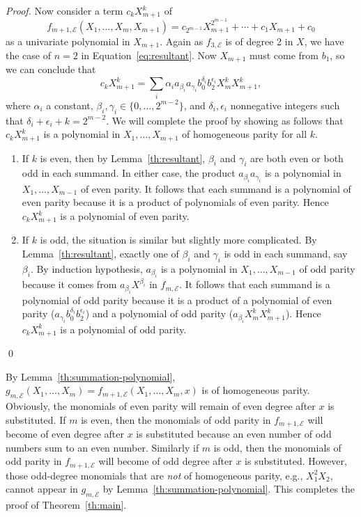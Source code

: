 \begin{proof}
  Now consider a term $c_kX_{m+1}^k$ of
  \[ f_{m+1,\mathcal
      E}(X_1,\ldots,X_m,X_{m+1})=c_{2^{m-1}}X_{m+1}^{2^{m-1}}+\cdots+c_1X_{m+1}+c_0 \]
  as a univariate polynomial in $X_{m+1}$.
  Again as $f_{3,\mathcal E}$ is of degree 2 in $X$, we have the case
  of $n=2$ in Equation~\ref{eq:resultant}.
  Now $X_{m+1}$ must come from $b_1$, so we can conclude that
  \[ c_kX_{m+1}^k=\sum_i\alpha_i a_{\beta_i} a_{\gamma_i}
    b_0^{\delta_i} b_2^{\epsilon_i} X_m^kX_{m+1}^k, \] where
  $\alpha_i$ a constant, $\beta_i,\gamma_i\in\{0,\ldots,2^{m-2}\}$,
  and $\delta_i,\epsilon_i$ nonnegative integers such that
  $\delta_i+\epsilon_i+k=2^{m-2}$.
  We will complete the proof by showing as follows that $c_kX_{m+1}^k$
  is a polynomial in $X_1,\ldots,X_{m+1}$ of homogeneous parity for
  all $k$.
  \begin{enumerate}
  \item If $k$ is even, then by Lemma~\ref{th:resultant},  $\beta_i$
    and $\gamma_i$ are both even or both odd in each summand.
    In either case, the product $a_{\beta_i}a_{\gamma_i}$ is a
    polynomial in $X_1,\ldots,X_{m-1}$ of even parity.
    It follows that each summand is a polynomial of even parity
    because it is a product of polynomials of even parity.
    Hence $c_kX_{m+1}^k$ is a polynomial of even parity.
  \item If $k$ is odd, the situation is similar but slightly more
    complicated.
    By Lemma~\ref{th:resultant}, exactly one of $\beta_i$ and
    $\gamma_i$ is odd in each summand, say $\beta_i$.
    By induction hypothesis, $a_{\beta_i}$ is a polynomial in
    $X_1,\ldots,X_{m-1}$ of odd parity because it comes from
    $a_{\beta_i} X^{\beta_i}$ in $f_{m,\mathcal E}$.
    It follows that each summand is a polynomial of odd parity because
    it is a product of a polynomial of even parity
    ($a_{\gamma_i} b_0^{\delta_i} b_2^{\epsilon_i}$) and a polynomial
    of odd parity ($a_{\beta_i} X_m^kX_{m+1}^k$).
    Hence $c_kX_{m+1}^k$ is a polynomial of odd parity.
  \end{enumerate}
  \qed
\end{proof}

By Lemma~\ref{th:summation-polynomial},
$g_{m,\mathcal E}(X_1,\ldots,X_m)=f_{m+1,\mathcal
  E}(X_1,\ldots,X_m,x)$ is of homogeneous parity.
%
Obviously, the monomials of even parity will remain of even degree
after $x$ is substituted.
%
If $m$ is even, then the monomials of odd parity in
$f_{m+1,\mathcal E}$ will become of even degree after $x$ is
substituted because an even number of odd numbers sum to an even
number.
%
Similarly if $m$ is odd, then the monomials of odd parity in
$f_{m+1,\mathcal E}$ will become of odd degree after $x$ is
substituted.
%
However, those odd-degree monomials that are \emph{not} of homogeneous
parity, e.g., $X_1^2X_2$, cannot appear in $g_{m,\mathcal E}$ by
Lemma~\ref{th:summation-polynomial}.
%
This completes the proof of Theorem~\ref{th:main}.

